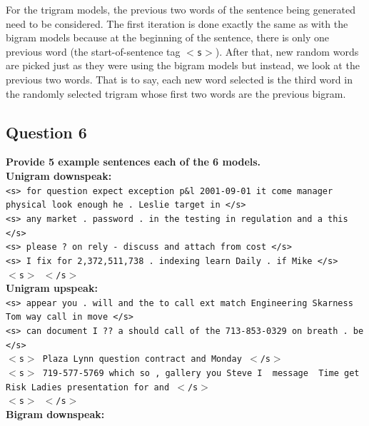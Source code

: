 \documentclass{article} %
\begin{document}
For the trigram models, the previous two words of the sentence being generated need to be considered. The first iteration is done exactly the same as with the bigram models because at the beginning of the sentence, there is only one previous word (the start-of-sentence tag  \texttt{$<$s$>$}). After that, new random words are picked just as they were using the bigram models but instead, we look at the previous two words. That is to say, each new word selected is the third word in the randomly selected trigram whose first two words are the previous bigram.\\


\lipsum[2] %

\subsection*{Question 6}

\textbf{Provide 5 example sentences each of the 6 models.}
\\
\textbf{Unigram downspeak:}\\

\texttt{<s> for question expect exception p\&l 2001-09-01 it come manager physical look enough he . Leslie target in </s>\\
<s> any market . password . in the testing in regulation and a this </s>\\
<s> please ? on rely - discuss and attach from cost </s>\\
<s> I fix for 2,372,511,738 . indexing learn Daily . if Mike </s>\\
$<$s$>$ $<$/s$>$}\\

\textbf{Unigram upspeak:}\\

\texttt{<s> appear you . will and the to call ext match Engineering Skarness Tom way call in move </s>\\
<s> can document I ?? a should call of the 713-853-0329 on breath . be </s>\\
$<$s$>$ Plaza Lynn question contract and Monday $<$/s$>$\\
$<$s$>$ 719-577-5769 which so , gallery you Steve I \ message \ Time get Risk Ladies presentation for and $<$/s$>$\\
$<$s$>$ $<$/s$>$}\\

\textbf{Bigram downspeak:}\\
\end{document}
